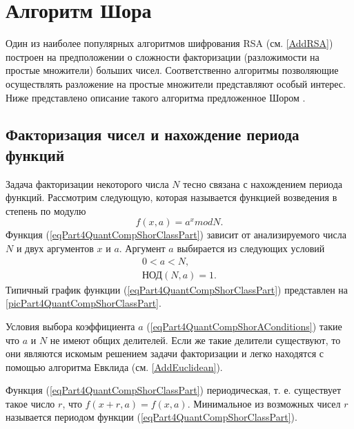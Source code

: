 \section{Алгоритм Шора}
\label{Part4QuantCompShor}
Один из наиболее популярных алгоритмов шифрования RSA (см. 
\autoref{AddRSA}) 
построен на предположении о сложности факторизации
(разложимости на простые множители) больших чисел. Соответственно
алгоритмы позволяющие осуществлять разложение на простые множители
представляют особый интерес. Ниже представлено описание такого
алгоритма предложенное Шором \cite{bShor94}.

\subsection{Факторизация чисел и нахождение периода функций}
Задача факторизации некоторого числа $N$ тесно связана с нахождением периода
функций. Рассмотрим следующую, которая называется функцией возведения
в степень по модулю
\begin{equation}
f\left(x, a\right) = a^x mod N.
\label{eqPart4QuantCompShorClassPart}
\end{equation}
Функция (\ref{eqPart4QuantCompShorClassPart}) зависит от
анализируемого числа $N$ и двух аргументов $x$ и $a$. Аргумент $a$
выбирается из следующих условий
\begin{eqnarray}
0 < a < N,
\nonumber \\
\mbox{НОД}\left(N, a\right) = 1.
\label{eqPart4QuantCompShorAConditions}
\end{eqnarray}
Типичный график функции (\ref{eqPart4QuantCompShorClassPart}) представлен на
\autoref{picPart4QuantCompShorClassPart}.




Условия выбора коэффициента $a$
(\ref{eqPart4QuantCompShorAConditions}) такие что $a$ и $N$ не имеют
общих делителей. Если же такие делители существуют, то они являются
искомым решением задачи факторизации и легко находятся с помощью
алгоритма Евклида (см. \autoref{AddEuclidean}).

Функция (\ref{eqPart4QuantCompShorClassPart}) периодическая,
т. е. существует такое число $r$, что $f\left(x + r, a\right) = 
f\left(x, a\right)$. Минимальное из возможных чисел $r$ называется
периодом функции (\ref{eqPart4QuantCompShorClassPart}). 

